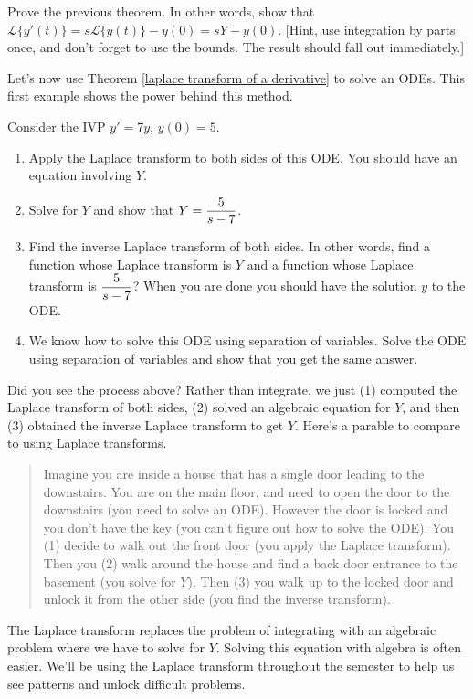 \begin{problem}
 Prove the previous theorem.  In other words, show that $\mathscr{L}\{y'(t)\} = s \mathscr{L}\{y(t)\} - y(0) = sY - y(0).$  [Hint, use integration by parts once, and don't forget to use the bounds. The result should fall out immediately.]
\end{problem}


Let's now use Theorem \ref{laplace transform of a derivative} to solve an ODEs. This first example shows the power behind this method.
\begin{problem}
 Consider the IVP $y'=7y$, $y(0)=5$.  
\begin{enumerate}
 \item Apply the Laplace transform to both sides of this ODE.  You should have an equation involving $Y$. 
 \item Solve for $Y$ and show that $\displaystyle Y=\frac{5}{s-7}$.  
 \item Find the inverse Laplace transform of both sides.  In other words, find a function whose Laplace transform is $Y$ and a function whose Laplace transform is $\displaystyle \frac{5}{s-7}$?  When you are done you should have the solution $y$ to the ODE. 
 \item We know how to solve this ODE using separation of variables.  Solve the ODE using separation of variables and show that you get the same answer.  
\end{enumerate}
\end{problem}
Did you see the process above?  Rather than integrate, we just (1) computed the Laplace transform of both sides, (2) solved an algebraic equation for $Y$, and then (3) obtained the inverse Laplace transform to get $Y$.  
Here's a parable to compare to using Laplace transforms.  
\begin{quote}
Imagine you are inside a house that has a single door leading to the downstairs.  You are on the main floor, and need to open the door to the downstairs (you need to solve an ODE). 
However the door is locked and you don't have the key (you can't figure out how to solve the ODE). 
You (1) decide to walk out the front door (you apply the Laplace transform).  
Then you (2) walk around the house and find a back door entrance to the basement (you solve for $Y$).  
Then (3) you walk up to the locked door and unlock it from the other side (you find the inverse transform).
\end{quote}
The Laplace transform replaces the problem of integrating with an algebraic problem where we have to solve for $Y$. Solving this equation with algebra is often easier. We'll be using the Laplace transform throughout the semester to help us see patterns and unlock difficult problems.








